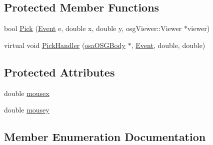 \subsection*{Protected Member Functions}
\begin{DoxyCompactItemize}
\item 
bool \hyperlink{classosa_o_s_g_pick_ae0660ad69e814ce749256a260f33cc56}{Pick} (\hyperlink{classosa_o_s_g_pick_af50ae1a966b6f3282b707d73f87081d8}{Event} e, double x, double y, osg\+Viewer\+::\+Viewer $\ast$viewer)
\item 
virtual void \hyperlink{classosa_o_s_g_pick_a94f0070f479012ffa3c5717c617072c9}{Pick\+Handler} (\hyperlink{classosa_o_s_g_body}{osa\+O\+S\+G\+Body} $\ast$, \hyperlink{classosa_o_s_g_pick_af50ae1a966b6f3282b707d73f87081d8}{Event}, double, double)
\end{DoxyCompactItemize}
\subsection*{Protected Attributes}
\begin{DoxyCompactItemize}
\item 
double \hyperlink{classosa_o_s_g_pick_a6a873ebac73e6a50727bf6899f4d3ba9}{mousex}
\item 
double \hyperlink{classosa_o_s_g_pick_a0ff8d75903e0ff5611df44df27d2b374}{mousey}
\end{DoxyCompactItemize}


\subsection{Member Enumeration Documentation}
\hypertarget{classosa_o_s_g_pick_af50ae1a966b6f3282b707d73f87081d8}{}
